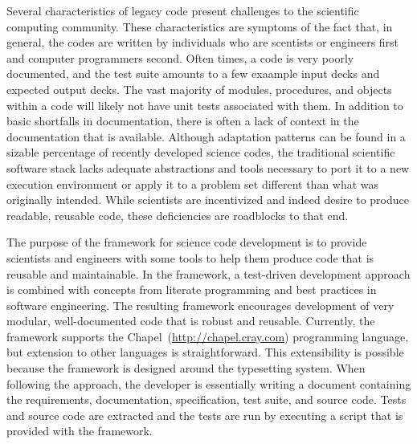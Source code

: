 \label{Tutorial_Introduction}

Several characteristics of legacy code present challenges to the scientific computing community. 
These characteristics are symptoms of the fact that, in general, the codes are written by individuals who are 
scentists or engineers first and computer programmers second. 
Often times, a code is very poorly documented, and the test suite amounts to a few exaample 
input decks and expected output decks. The vast majority of modules, procedures, and objects within a code
will likely not have unit tests associated with them. 
In addition to basic shortfalls in documentation, there is often a lack of context in the documentation that
is available.
Although adaptation patterns can be found in a sizable percentage of recently developed science codes, 
the traditional scientific software stack lacks adequate abstractions and tools necessary
to port it to a new execution environment or apply it to a problem set different than what was 
originally intended.\cite{kang}
While scientists are incentivized and indeed desire to produce readable, reusable code, these deficiencies 
are roadblocks to that end.\cite{petre} 

The purpose of the \seamless framework for science code development is to provide scientists and engineers
with some tools to help them produce code that is reusable and maintainable. 
In the \seamless framework, a test-driven development 
approach is combined with concepts from literate programming\cite{knuth} and 
best practices in software engineering. The resulting framework encourages development of very modular, 
well-documented code that is robust and reusable.  Currently, the framework supports 
the Chapel~(\url{http://chapel.cray.com}) programming language, but extension to other languages is 
straightforward.  This extensibility is possible because the framework is designed around the \latex
typesetting system. When following the \seamless approach, the developer is essentially writing a \latex
document containing the requirements, documentation, specification, test suite, and source code. Tests and 
source code are extracted and the tests are run by executing a script that is provided with the framework.

